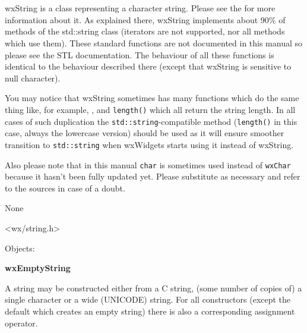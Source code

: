 \section{}\label{wxstring}

wxString is a class representing a character string. Please see the 
 for more information about it. As explained
there, wxString implements about 90\% of methods of the std::string class (iterators
are not supported, nor all methods which use them).
These standard functions are not documented in this manual so please see the STL documentation.
The behaviour of all these functions is identical to the behaviour described
there (except that wxString is sensitive to null character).

You may notice that wxString sometimes has many functions which do the same
thing like, for example, , 
 and {\tt length()} which all return the string
length. In all cases of such duplication the {\tt std::string}-compatible
method ({\tt length()} in this case, always the lowercase version) should be
used as it will ensure smoother transition to {\tt std::string} when wxWidgets
starts using it instead of wxString.

Also please note that in this manual \texttt{char} is sometimes used instead of 
\texttt{wxChar} because it hasn't been fully updated yet. Please substitute as
necessary and refer to the sources in case of a doubt.



None


<wx/string.h>


Objects:

{\bf wxEmptyString}




\label{constructorsinwxstring}

A string may be constructed either from a C string, (some number of copies of)
a single character or a wide (UNICODE) string. For all constructors (except the
default which creates an empty string) there is also a corresponding assignment
operator.

